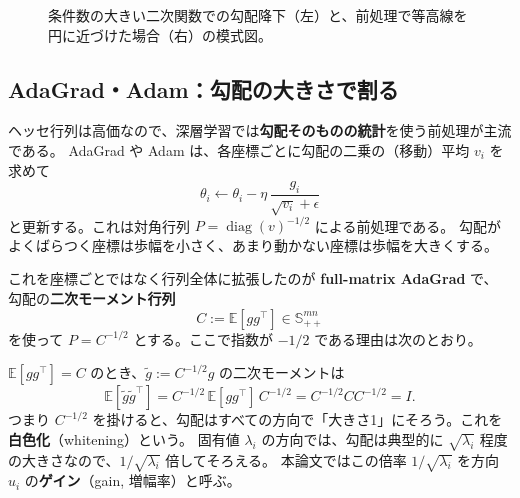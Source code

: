 \documentclass[a4paper,11pt]{ltjsarticle}
\theoremstyle{definition}
\theoremstyle{plain}
\newcommand{\E}{\mathbb{E}}
\newcommand{\Spd}[1]{\mathbb{S}^{#1}_{++}}
\DeclareMathOperator{\diag}{diag}
\newcommand{\T}{^{\top}}
\begin{document}
\begin{figure}[t]
\centering
{}
\caption{条件数の大きい二次関数での勾配降下（左）と、前処理で等高線を円に近づけた場合（右）の模式図。}
\end{figure}

\subsection{AdaGrad・Adam：勾配の大きさで割る}

ヘッセ行列は高価なので、深層学習では\textbf{勾配そのものの統計}を使う前処理が主流である。
AdaGrad や Adam は、各座標ごとに勾配の二乗の（移動）平均 $v_i$ を求めて
\[
  \theta_i \leftarrow \theta_i - \eta\,\frac{g_i}{\sqrt{v_i}+\epsilon}
\]
と更新する。これは対角行列 $P = \diag(v)^{-1/2}$ による前処理である。
勾配がよくばらつく座標は歩幅を小さく、あまり動かない座標は歩幅を大きくする。

これを座標ごとではなく行列全体に拡張したのが \textbf{full-matrix AdaGrad} で、
勾配の\textbf{二次モーメント行列}
\begin{equation}
  C := \E[g g\T]\in\Spd{mn}
\end{equation}
を使って $P = C^{-1/2}$ とする。ここで指数が $-1/2$ である理由は次のとおり。

\begin{intuitionbox}
$\E[gg\T] = C$ のとき、$\tilde g := C^{-1/2}g$ の二次モーメントは
\[
  \E[\tilde g\tilde g\T] = C^{-1/2}\,\E[gg\T]\,C^{-1/2} = C^{-1/2}CC^{-1/2} = I.
\]
つまり $C^{-1/2}$ を掛けると、勾配はすべての方向で「大きさ1」にそろう。これを\textbf{白色化}（whitening）という。
固有値 $\lambda_i$ の方向では、勾配は典型的に $\sqrt{\lambda_i}$ 程度の大きさなので、$1/\sqrt{\lambda_i}$ 倍してそろえる。
本論文ではこの倍率 $1/\sqrt{\lambda_i}$ を方向 $u_i$ の\textbf{ゲイン}（gain, 増幅率）と呼ぶ。
\end{intuitionbox}
\end{document}
